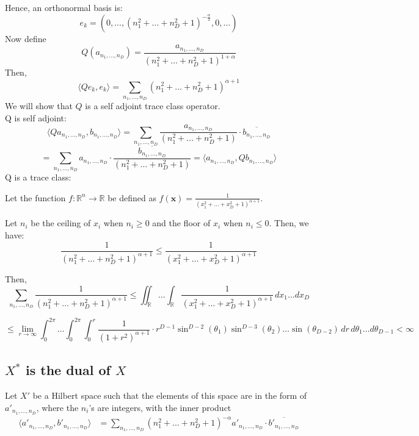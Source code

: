 \documentclass{article}
\theoremstyle{definition}
\begin{document}
Hence, an orthonormal basis is:
\[
e_k = (0,..., (n_1^2 +...+ n_D^2 + 1)^{-\frac{\alpha}{2}},0,...)
\]
Now define
\[Q(a_{n_1,..., n_D}) = \frac{a_{n_1,..., n_D}}{(n_1^2 + \ldots + n_D^2 + 1)^{1+\alpha}}
\]
Then, 
\[
\langle Qe_k, e_k \rangle = \sum_{n_1,..., n_D} (n_1^2 +...+ n_D^2 + 1)^{\alpha + 1}
\]
We will show that $Q$ is a self adjoint trace class operator.\\
Q is self adjoint:
\[
\langle Qa_{n_1,..., n_D},b_{n_1,..., n_D} \rangle = \sum_{n_1,\ldots, n_D} \frac{a_{n_1,\ldots, n_D}}{(n_1^2 + \ldots + n_D^2 + 1)} \cdot \overline{b_{n_1,\ldots, n_D}}
\]
\[
= \sum_{n_1,\ldots, n_D} a_{n_1,\ldots, n_D} \cdot \frac{\overline{b_{n_1,\ldots, n_D}}}{(n_1^2 + \ldots + n_D^2 + 1)}= \langle a_{n_1,..., n_D},Qb_{n_1,..., n_D} \rangle
\]
Q is a trace class:

Let the function \(f:\mathbb{R}^n \rightarrow \mathbb{R} \) be defined as \(f(\mathbf{x}) = \frac{1}{(x_1^2 + \ldots + x_D^2 + 1)^{\alpha + 1}}\).

Let \(n_i\) be the ceiling of \(x_i\) when \(n_i \geq 0\) and the floor of \(x_i\) when \(n_i \leq 0\). Then, we have:
\[
\frac{1}{(n_1^2 + \ldots + n_D^2 + 1)^{\alpha + 1}} \leq \frac{1}{(x_1^2 + \ldots + x_D^2 + 1)^{\alpha + 1}}
\]

Then,
\[
\sum_{n_1,\ldots,n_D} \frac{1}{(n_1^2 + \ldots + n_D^2 + 1)^{\alpha + 1}} \leq \iint_{\mathbb{R}} \ldots \int_{\mathbb{R}} \frac{1}{(x_1^2 + \ldots + x_D^2 + 1)^{\alpha + 1}} \,dx_1 \ldots dx_D
\]

\[
\leq \lim_{{r \to \infty}} \int_{0}^{2\pi} \ldots \int_{0}^{2\pi} \int_{0}^{r} \frac{1}{(1+r^2)^{\alpha + 1}} \cdot r^{D-1} \sin^{D-2}(\theta_1) \sin^{D-3}(\theta_2) \ldots \sin(\theta_{D-2}) \,dr \,d\theta_1 \ldots d\theta_{D-1}
< \infty
\]

\subsection{$X^*$ is the dual of $X$}
 
Let $X'$ be a Hilbert space such that the elements of this space are in the form of $a'_{n_1,..., n_D}$, where the $n_i$'s are integers, with the inner product 
\begin{align}
    \langle a'_{n_1,..., n_D},b'_{n_1,..., n_D} \rangle &= \sum_{n_1,..., n_D} (n_1^2 +...+ n_D^2 + 1)^{-\alpha} a'_{n_1,..., n_D} \cdot \overline{b'_{n_1,..., n_D}} \label{1}
\end{align}
\end{document}
